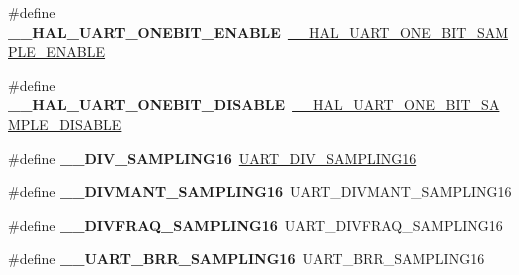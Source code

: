 \begin{DoxyCompactItemize}
\item 
\mbox{\label{group___h_a_l___u_a_r_t___aliased___defines_gaf1ec2145d7a73ee2f74ec334c8210092}} 
\#define {\bfseries \+\_\+\+\_\+\+H\+A\+L\+\_\+\+U\+A\+R\+T\+\_\+\+O\+N\+E\+B\+I\+T\+\_\+\+E\+N\+A\+B\+LE}~\mbox{\hyperlink{group___u_a_r_t___exported___macros_ga3524747e5896296ab066d786431503ce}{\+\_\+\+\_\+\+H\+A\+L\+\_\+\+U\+A\+R\+T\+\_\+\+O\+N\+E\+\_\+\+B\+I\+T\+\_\+\+S\+A\+M\+P\+L\+E\+\_\+\+E\+N\+A\+B\+LE}}
\item 
\mbox{\label{group___h_a_l___u_a_r_t___aliased___defines_ga93fcc521745111012558544b198be1ce}} 
\#define {\bfseries \+\_\+\+\_\+\+H\+A\+L\+\_\+\+U\+A\+R\+T\+\_\+\+O\+N\+E\+B\+I\+T\+\_\+\+D\+I\+S\+A\+B\+LE}~\mbox{\hyperlink{group___u_a_r_t___exported___macros_ga2dbd7e6592e8c5999f817b69f0fd24bb}{\+\_\+\+\_\+\+H\+A\+L\+\_\+\+U\+A\+R\+T\+\_\+\+O\+N\+E\+\_\+\+B\+I\+T\+\_\+\+S\+A\+M\+P\+L\+E\+\_\+\+D\+I\+S\+A\+B\+LE}}
\item 
\mbox{\label{group___h_a_l___u_a_r_t___aliased___defines_ga95b08a06aee2ed42542ac95224cf13a8}} 
\#define {\bfseries \+\_\+\+\_\+\+D\+I\+V\+\_\+\+S\+A\+M\+P\+L\+I\+N\+G16}~\mbox{\hyperlink{group___u_a_r_t___private___macros_gac2423ff86559eb91198bcc438caec865}{U\+A\+R\+T\+\_\+\+D\+I\+V\+\_\+\+S\+A\+M\+P\+L\+I\+N\+G16}}
\item 
\mbox{\label{group___h_a_l___u_a_r_t___aliased___defines_gaae0a8a1c78ef85c5d4e980f123dce2cb}} 
\#define {\bfseries \+\_\+\+\_\+\+D\+I\+V\+M\+A\+N\+T\+\_\+\+S\+A\+M\+P\+L\+I\+N\+G16}~U\+A\+R\+T\+\_\+\+D\+I\+V\+M\+A\+N\+T\+\_\+\+S\+A\+M\+P\+L\+I\+N\+G16
\item 
\mbox{\label{group___h_a_l___u_a_r_t___aliased___defines_ga165ca293ce5aa1dc825ce6e69f104f99}} 
\#define {\bfseries \+\_\+\+\_\+\+D\+I\+V\+F\+R\+A\+Q\+\_\+\+S\+A\+M\+P\+L\+I\+N\+G16}~U\+A\+R\+T\+\_\+\+D\+I\+V\+F\+R\+A\+Q\+\_\+\+S\+A\+M\+P\+L\+I\+N\+G16
\item 
\mbox{\label{group___h_a_l___u_a_r_t___aliased___defines_ga4ef81a279eab794f777deede4ef777cd}} 
\#define {\bfseries \+\_\+\+\_\+\+U\+A\+R\+T\+\_\+\+B\+R\+R\+\_\+\+S\+A\+M\+P\+L\+I\+N\+G16}~U\+A\+R\+T\+\_\+\+B\+R\+R\+\_\+\+S\+A\+M\+P\+L\+I\+N\+G16

\end{DoxyCompactItemize}
